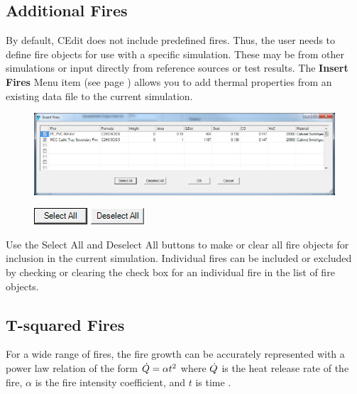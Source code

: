 \subsection{Additional Fires}

By default, CEdit does not include predefined fires. Thus, the user needs to define fire objects for use with a specific simulation.  These may be from other simulations or input directly from reference sources or test results. The \textbf{Insert Fires} Menu item (see page \pageref{Fires_Menu}) allows you to add thermal properties from an existing data file to the current simulation.

\begin{figure}[h!]
\begin{center}
\includegraphics[width=6.5in]{FIGURES/Input_File/Insert_Fire_Objects}
\end{center}
\end{figure}

\begin{figure}
  \includegraphics[width=0.781in]{FIGURES/Input_File/Select_All_Button}
  \includegraphics[width=0.781in]{FIGURES/Input_File/Deselect_All_Button}
\end{figure}

Use the Select All and Deselect All buttons to make or clear all fire objects for inclusion in the current simulation.  Individual fires can be included or excluded by checking or clearing the check box for an individual fire in the list of fire objects.


\subsection{T-squared Fires}

For a wide range of fires, the fire growth can be accurately represented with a power law relation of the form $\dot{Q}=\alpha t^2$  where $\dot{Q}$  is the heat release rate of the fire, $\alpha$ is the fire intensity coefficient, and $t$ is time \cite{Schifiliti:2002}.

